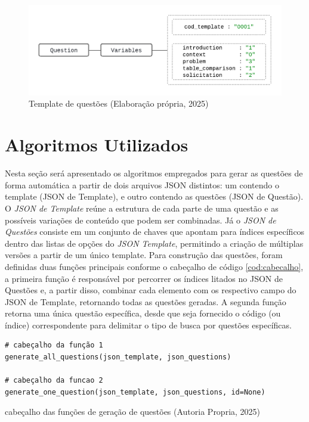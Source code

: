 \begin{figure}[ht]
	\centering
	\includegraphics[width=14cm]{./imagens/capitulo5/template-2}
	\caption{Template de questões (Elaboração própria, 2025) }
	\label{fig:template-2}
\end{figure}

\section{Algoritmos Utilizados}

Nesta seção será apresentado os algoritmos empregados para gerar as questões de forma automática a partir de dois arquivos JSON distintos: um contendo o template (JSON de Template), e outro contendo as questões (JSON de Questão). O \textit{JSON de Template} reúne a estrutura de cada parte de uma questão e as possíveis variações de conteúdo que podem ser combinadas. Já o \textit{JSON de Questões} consiste em um conjunto de chaves que apontam para índices específicos dentro das listas de opções do \textit{JSON Template}, permitindo a criação de múltiplas versões a partir de um único template. 
Para construção das questões, foram definidas duas funções principais conforme o cabeçalho de código \ref{cod:cabecalho}, a primeira função é responsável por percorrer os índices litados no JSON de Questões e, a partir disso, combinar cada elemento com os respectivo campo do JSON de Template, retornando todas as questões geradas. A segunda função retorna uma única questão específica, desde que seja fornecido o código (ou índice) correspondente para delimitar o tipo de busca por questões específicas.


\begin{listing}[ht]
\begin{verbatim}
# cabeçalho da função 1
generate_all_questions(json_template, json_questions)

# cabeçalho da funcao 2
generate_one_question(json_template, json_questions, id=None) 
\end{verbatim}
\caption{cabeçalho das funções de geração de questões (Autoria Propria, 2025)}
\label{cod:cabecalho}
\end{listing}

